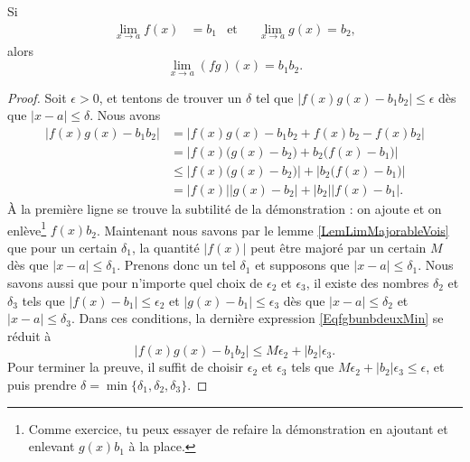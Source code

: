 \begin{theorem}     \label{Tholimfgabab}
    Si
    \begin{align}
        \lim_{x\to a}f(x)&=b_1&\text{et}&&\lim_{x\to a}g(x)=b_2,
    \end{align}
    alors
    \begin{equation}
        \lim_{x\to a}(fg)(x)=b_1b_2.
    \end{equation}
\end{theorem}

\begin{proof}
    Soit $\epsilon>0$, et tentons de trouver un $\delta$ tel que $| f(x)g(x)-b_1b_2 |\leq \epsilon$ dès que $| x-a |\leq \delta$. Nous avons 
    \begin{equation}    \label{EqfgbunbdeuxMin}
    \begin{split}
    | f(x)g(x)-b_1b_2 |&=|  f(x)g(x)-b_1b_2 +f(x)b_2-f(x)b_2 |\\
            &=\left|   f(x)\big( g(x)-b_2 \big)+b_2\big( f(x)-b_1 \big)    \right|\\
            &\leq \left|  f(x)\big( g(x)-b_2 \big)  \right|+\left|  b_2\big( f(x)-b_1 \big)    \right|\\
            &= | f(x) | | g(x)-b_2  |+| b_2 | |f(x)-b_1 |.  
    \end{split}
    \end{equation}
    À la première ligne se trouve la subtilité de la démonstration : on ajoute et on enlève\footnote{Comme exercice, tu peux essayer de refaire la démonstration en ajoutant et enlevant $g(x)b_1$ à la place.} $f(x)b_2$. Maintenant nous savons par le lemme \ref{LemLimMajorableVois} que pour un certain $\delta_1$, la quantité $| f(x) |$ peut être majoré par un certain $M$ dès que $| x-a |\leq \delta_1$. Prenons donc un tel $\delta_1$ et supposons que $| x-a |\leq \delta_1$. Nous savons aussi que pour n'importe quel choix de $\epsilon_2$ et $\epsilon_3$, il existe des nombres $\delta_2$ et $\delta_3$ tels que $| f(x)-b_1 |\leq \epsilon_2$ et $| g(x)-b_1 |\leq \epsilon_3$ dès que $| x-a |\leq\delta_2$ et $| x-a |\leq\delta_3$. Dans ces conditions, la dernière expression \eqref{EqfgbunbdeuxMin} se réduit à
    \begin{equation}
    | f(x)g(x)-b_1b_2 |\leq M\epsilon_2+| b_2 |\epsilon_3.
    \end{equation}
    Pour terminer la preuve, il suffit de choisir $\epsilon_2$ et $\epsilon_3$ tels que $M\epsilon_2+| b_2 |\epsilon_3\leq\epsilon$, et puis prendre $\delta=\min\{ \delta_1,\delta_2,\delta_3 \}$.


\end{proof}
